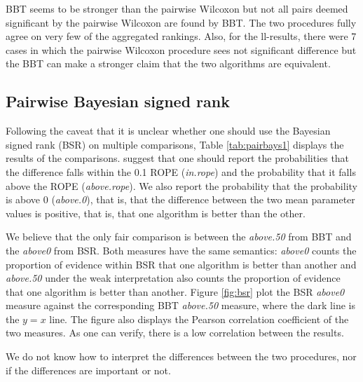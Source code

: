 \documentclass[twoside,11pt,preprint]{article}
\begin{document}
BBT seems to be stronger than the pairwise Wilcoxon but not all pairs
deemed significant by the pairwise Wilcoxon are found by BBT. The two
procedures fully agree on very few of the aggregated rankings. Also,
for the ll-results, there were 7 cases in which the pairwise Wilcoxon
procedure sees not significant difference but the BBT can make a
stronger claim that the two algorithms are equivalent.

\hypertarget{pairwise-bayesian-signed-rank}{%
\subsection{\texorpdfstring{Pairwise Bayesian signed rank \label{sec:comp-bsr}}{Pairwise Bayesian signed rank }}\label{pairwise-bayesian-signed-rank}}

Following the caveat that it is unclear whether one should use the
Bayesian signed rank (BSR) on multiple comparisons, Table
\ref{tab:pairbays1} displays the results of the
comparisons. \citet{benavoli2017time} suggest that one should report the
probabilities that the difference falls within the 0.1 ROPE
({\em in.rope}) and the probability that it falls above the ROPE
({\em above.rope}). We also report the probability that the
probability is above 0 ({\em above.0}), that is, that the difference
between the two mean parameter values is positive, that is, that one
algorithm is better than the other.

We believe that the only fair comparison is between the
{\em above.50} from BBT and the {\em above0} from BSR. Both measures
have the same semantics: {\em above0} counts the proportion of
evidence within BSR that one algorithm is better
than another and {\em above.50} under the weak interpretation also
counts the proportion of evidence that one algorithm is better than
another. Figure \ref{fig:bsr} plot the BSR {\em above0} measure against the
corresponding BBT {\em above.50} measure, where the dark line is the
\(y=x\) line. The figure also displays the Pearson correlation
coefficient of the two measures. As one can verify, there is a low
correlation between the results.

We do not know how to interpret the differences between the two
procedures, nor if the differences are important or not.
\end{document}
